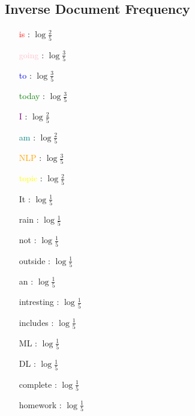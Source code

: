 \subsection{Inverse Document Frequency}
\begin{multicols}{3}
\begin{itemize}
	\item [\textcolor{red}{is}] : $\log \frac{2}{5}$  
	\item [\textcolor{pink}{going}] : $\log \frac{3}{5}$  
	\item [\textcolor{blue}{to}] : $\log \frac{3}{5}$  
	\item [\textcolor{green}{today}] : $\log \frac{3}{5}$  
	\item [\textcolor{purple}{I}] : $\log \frac{2}{5}$  
	\item [\textcolor{teal}{am}] : $\log \frac{2}{5}$  
		\columnbreak
\end{itemize}
\begin{itemize}
	\item [\textcolor{orange}{NLP}] : $\log \frac{3}{5}$  
	\item [\textcolor{yellow}{topic}] : $\log \frac{2}{5}$  
	\item [It] : $\log \frac{1}{5}$
	\item [rain] : $\log \frac{1}{5}$
	\item [not] : $\log \frac{1}{5}$
	\item [outside] : $\log \frac{1}{5}$
\end{itemize}
		\columnbreak
\begin{itemize}
	\item [an] : $\log \frac{1}{5}$
	\item [intresting] : $\log \frac{1}{5}$
	\item [includes] : $\log \frac{1}{5}$
	\item [ML] : $\log \frac{1}{5}$
	\item [DL] : $\log \frac{1}{5}$
	\item [complete] : $\log \frac{1}{5}$
	\item [homework] : $\log \frac{1}{5}$
\end{itemize}
\end{multicols}

